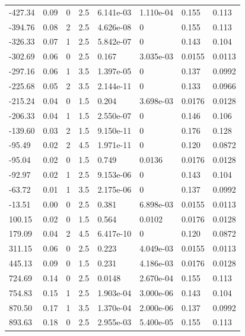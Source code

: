\documentclass[preview]{standalone}
\begin{document}
{{\begin{tabular}{L{1.2cm}C{1.2cm} C{0.3cm}C{0.5cm} C{1.4cm}C{1.4cm} C{1.4cm}C{1.4cm}}
  -427.34  &  0.09  & 0     & 2.5 &  6.141e-03  & 1.110e-04  & 0.155 &  0.113   \\ 
  -394.76  &  0.08  & 2     & 2.5 &  4.626e-08  & 0  & 0.155 &  0.113   \\ 
  -326.33  &  0.07  & 1     & 2.5 &  5.842e-07  & 0  & 0.143 &  0.104   \\ 
  -302.69  &  0.06  & 0     & 2.5 &  0.167  & 3.035e-03  & 0.0155 &  0.0113   \\ 
  -297.16  &  0.06  & 1     & 3.5 &  1.397e-05  & 0  & 0.137 &  0.0992   \\ 
  -225.68  &  0.05  & 2     & 3.5 &  2.144e-11  & 0  & 0.133 &  0.0966   \\ 
  -215.24  &  0.04  & 0     & 1.5 &  0.204  & 3.698e-03  & 0.0176 &  0.0128   \\ 
  -206.33  &  0.04  & 1     & 1.5 &  2.550e-07  & 0  & 0.146 &  0.106   \\ 
  -139.60  &  0.03  & 2     & 1.5 &  9.150e-11  & 0  & 0.176 &  0.128   \\ 
  -95.49  &  0.02  & 2     & 4.5 &  1.971e-11  & 0  & 0.120 &  0.0872   \\ 
  -95.04  &  0.02  & 0     & 1.5 &  0.749  & 0.0136  & 0.0176 &  0.0128   \\ 
  -92.97  &  0.02  & 1     & 2.5 &  9.153e-06  & 0  & 0.143 &  0.104   \\ 
  -63.72  &  0.01  & 1     & 3.5 &  2.175e-06  & 0  & 0.137 &  0.0992   \\ 
  -13.51  &  0.00  & 0     & 2.5 &  0.381  & 6.898e-03  & 0.0155 &  0.0113   \\ 
  100.15  &  0.02  & 0     & 1.5 &  0.564  & 0.0102  & 0.0176 &  0.0128   \\ 
  179.09  &  0.04  & 2     & 4.5 &  6.417e-10  & 0  & 0.120 &  0.0872   \\ 
  311.15  &  0.06  & 0     & 2.5 &  0.223  & 4.049e-03  & 0.0155 &  0.0113   \\ 
  445.13  &  0.09  & 0     & 1.5 &  0.231  & 4.186e-03  & 0.0176 &  0.0128   \\ 
  724.69  &  0.14  & 0     & 2.5 &  0.0148  & 2.670e-04  & 0.155 &  0.113   \\ 
  754.83  &  0.15  & 1     & 2.5 &  1.903e-04  & 3.000e-06  & 0.143 &  0.104   \\ 
  870.50  &  0.17  & 1     & 3.5 &  1.370e-04  & 2.000e-06  & 0.137 &  0.0992   \\ 
  893.63  &  0.18  & 0     & 2.5 &  2.955e-03  & 5.400e-05  & 0.155 &  0.113   \\ 

\end{tabular}}}
\end{document}
